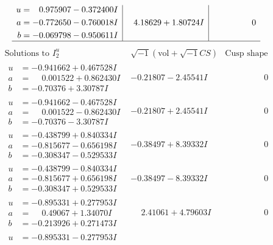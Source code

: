 \documentclass[1p]{elsarticle_modified}
\theoremstyle{definition}
\newcommand{\I}{\sqrt{-1}}
\begin{document}
$$\begin{array}{c|c|c}
\begin{aligned}
u &= \phantom{-}0.975907 - 0.372400 I \\
a &= -0.772650 - 0.760018 I \\
b &= -0.069798 - 0.950611 I\end{aligned}
 & \phantom{-}4.18629 + 1.80724 I & \phantom{-0.000000 } 0\\
 \hline 
 \end{array}$$\newpage$$\begin{array}{c|c|c}  
\text{Solutions to }I^u_{2}& \I (\text{vol} + \sqrt{-1}CS) & \text{Cusp shape}\\
 \hline 
\begin{aligned}
u &= -0.941662 + 0.467528 I \\
a &= \phantom{-}0.001522 + 0.862430 I \\
b &= -0.70376 + 3.30787 I\end{aligned}
 & -0.21807 - 2.45541 I & \phantom{-0.000000 } 0 \\ \hline\begin{aligned}
u &= -0.941662 - 0.467528 I \\
a &= \phantom{-}0.001522 - 0.862430 I \\
b &= -0.70376 - 3.30787 I\end{aligned}
 & -0.21807 + 2.45541 I & \phantom{-0.000000 } 0 \\ \hline\begin{aligned}
u &= -0.438799 + 0.840334 I \\
a &= -0.815677 - 0.656198 I \\
b &= -0.308347 - 0.529533 I\end{aligned}
 & -0.38497 + 8.39332 I & \phantom{-0.000000 } 0 \\ \hline\begin{aligned}
u &= -0.438799 - 0.840334 I \\
a &= -0.815677 + 0.656198 I \\
b &= -0.308347 + 0.529533 I\end{aligned}
 & -0.38497 - 8.39332 I & \phantom{-0.000000 } 0 \\ \hline\begin{aligned}
u &= -0.895331 + 0.277953 I \\
a &= \phantom{-}0.49067 + 1.34070 I \\
b &= -0.213926 + 0.271473 I\end{aligned}
 & \phantom{-}2.41061 + 4.79603 I & \phantom{-0.000000 } 0 \\ \hline\begin{aligned}
u &= -0.895331 - 0.277953 I \\

\end{aligned}
\end{array}$$
\end{document}
